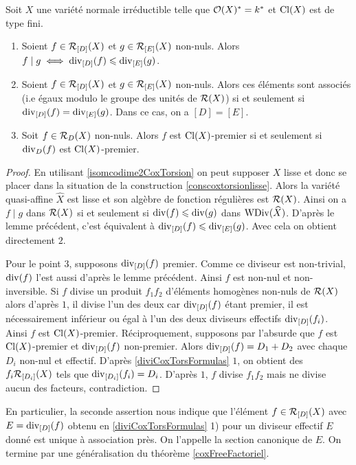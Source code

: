 \begin{prop}
Soit $X$ une variété normale irréductible telle que $\mathcal{O}(X)^*=k^*$ et $\operatorname{Cl}(X)$ est de type fini.
\begin{enumerate}
\item Soient $f\in \mathcal{R}_{[D]}(X)$ et $g\in \mathcal{R}_{[E]}(X)$ non-nuls. Alors $f\mid g\iff \operatorname{div}_{[D]}(f)\leqslant\operatorname{div}_{[E]}(g)$.
\item Soient $f\in \mathcal{R}_{[D]}(X)$ et $g\in \mathcal{R}_{[E]}(X)$ non-nuls. Alors ces éléments sont associés (i.e égaux modulo le groupe des unités de $\mathcal{R}(X)$) si et seulement si $\operatorname{div}_{[D]}(f)=\operatorname{div}_{[E]}(g)$. Dans ce cas, on a $[D]=[E]$.
\item Soit $f\in \mathcal{R}_D(X)$ non-nuls. Alors $f$ est $\operatorname{Cl}(X)$-premier si et seulement si $\operatorname{div}_D(f)$ est $\operatorname{Cl}(X)$-premier.
\end{enumerate}
\end{prop}
\begin{proof}
En utilisant \ref{isomcodime2CoxTorsion} on peut supposer $X$ lisse et donc se placer dans la situation de la construction \ref{conscoxtorsionlisse}. Alors la variété quasi-affine $\widehat{X}$ est lisse et son algèbre de fonction régulières est $\mathcal{R}(X)$. Ainsi on a $f\mid g$ dans $\mathcal{R}(X)$ si et seulement si $\operatorname{div}(f)\leqslant \operatorname{div}(g)$ dans $\operatorname{WDiv}(\widehat{X})$. D'après le lemme précédent, c'est équivalent à $\operatorname{div}_{[D]}(f)\leqslant\operatorname{div}_{[E]}(g)$. Avec cela on obtient directement $2$.

Pour le point $3$, supposons $\operatorname{div}_{[D]}(f)$ premier. Comme ce diviseur est non-trivial, $\operatorname{div}(f)$ l'est aussi d'après le lemme précédent. Ainsi $f$ est non-nul et non-inversible. Si $f$ divise un produit $f_1f_2$ d'éléments homogènes non-nuls de $\mathcal{R}(X)$ alors d'après $1$, il divise l'un des deux car $\operatorname{div}_{[D]}(f)$ étant premier, il est nécessairement inférieur ou égal à l'un des deux diviseurs effectifs  $\operatorname{div}_{[D]}(f_i)$. Ainsi $f$ est $\operatorname{Cl}(X)$-premier. Réciproquement, supposons par l'absurde que $f$ est $\operatorname{Cl}(X)$-premier et $\operatorname{div}_{[D]}(f)$ non-premier. Alors $\operatorname{div}_{[D]}(f)=D_1+D_2$ avec chaque $D_i$ non-nul et effectif. D'après \ref{diviCoxTorsFormulas} $1$, on obtient des $f_i\mathcal{R}_{[D_i]}(X)$ tels que $\operatorname{div}_{[D_i]}(f_i)=D_i$. D'après $1$, $f$ divise $f_1f_2$ mais ne divise aucun des facteurs, contradiction.
\end{proof}

En particulier, la seconde assertion nous indique que l'élément $f\in \mathcal{R}_{[D]}(X)$ avec $E=\operatorname{div}_{[D]}(f)$ obtenu en \ref{diviCoxTorsFormulas} 1) pour un diviseur effectif $E$ donné est unique à association près. On l'appelle la section canonique de $E$. On termine par une généralisation du théorème \ref{coxFreeFactoriel}.


